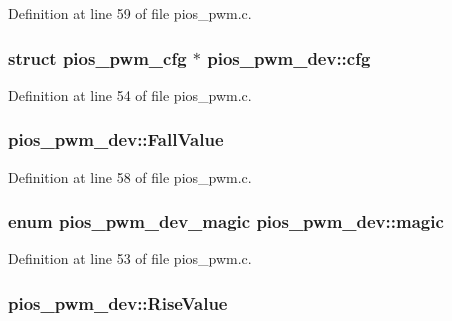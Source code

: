 Definition at line 59 of file pios\-\_\-pwm.\-c.

\hypertarget{structpios__pwm__dev_a879902a1111b771fe171269e1db3a537}{
\subsubsection[{cfg}]{\setlength{\rightskip}{0pt plus 5cm}struct {\bf pios\-\_\-pwm\-\_\-cfg} $\ast$ pios\-\_\-pwm\-\_\-dev\-::cfg}}\label{structpios__pwm__dev_a879902a1111b771fe171269e1db3a537}


Definition at line 54 of file pios\-\_\-pwm.\-c.

\hypertarget{structpios__pwm__dev_ad3484d9d98fd9b11c7abca2cdd9c9ee0}{
\subsubsection[{Fall\-Value}]{ pios\-\_\-pwm\-\_\-dev\-::\-Fall\-Value}}\label{structpios__pwm__dev_ad3484d9d98fd9b11c7abca2cdd9c9ee0}


Definition at line 58 of file pios\-\_\-pwm.\-c.

\hypertarget{structpios__pwm__dev_a30184bc599b287648e5b2430590a2057}{
\subsubsection[{magic}]{\setlength{\rightskip}{0pt plus 5cm}enum {\bf pios\-\_\-pwm\-\_\-dev\-\_\-magic} pios\-\_\-pwm\-\_\-dev\-::magic}}\label{structpios__pwm__dev_a30184bc599b287648e5b2430590a2057}


Definition at line 53 of file pios\-\_\-pwm.\-c.

\hypertarget{structpios__pwm__dev_ab54467e66397e1470fcda91714768c18}{
\subsubsection[{Rise\-Value}]{ pios\-\_\-pwm\-\_\-dev\-::\-Rise\-Value}}\label{structpios__pwm__dev_ab54467e66397e1470fcda91714768c18}


